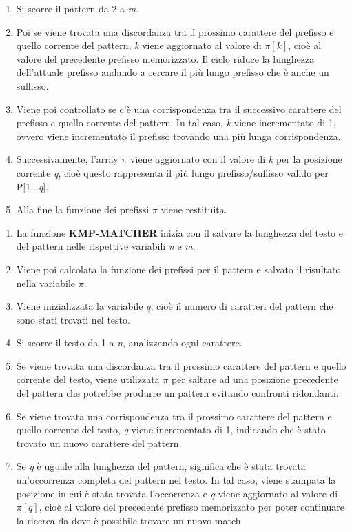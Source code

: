 \documentclass{article}
\begin{document}
\begin{itemize}
\begin{enumerate}[label=\arabic*a.]
              \item Si scorre il pattern da 2 a \textit{m}.
              \item Poi se viene trovata una discordanza tra il prossimo carattere del prefisso e quello corrente del pattern, \textit{k} viene aggiornato al valore di $\pi[k]$, cioè al valore del precedente prefisso memorizzato. Il ciclo riduce la lunghezza dell'attuale prefisso andando a cercare il più lungo prefisso che è anche un suffisso.
              \item Viene poi controllato se c'è una corrispondenza tra il successivo carattere del prefisso e quello corrente del pattern. In tal caso, \textit{k} viene incrementato di 1, ovvero viene incrementato il prefisso trovando una più lunga corrispondenza.
              \item Successivamente, l'array $\pi$ viene aggiornato con il valore di \textit{k} per la posizione corrente \textit{q}, cioè questo rappresenta il più lungo prefisso/suffisso valido per P[1...\textit{q}].
              \item Alla fine la funzione dei prefissi $\pi$ viene restituita.
          \end{enumerate}
          \begin{enumerate}[label=\arabic*b.]
              \item La funzione \textbf{KMP-MATCHER} inizia con il salvare la lunghezza del testo e del pattern nelle rispettive variabili \textit{n} e \textit{m}.
              \item Viene poi calcolata la funzione dei prefissi per il pattern e salvato il risultato nella variabile $\pi$.
              \item Viene inizializzata la variabile \textit{q}, cioè il numero di caratteri del pattern che sono stati trovati nel testo.
              \item Si scorre il testo da 1 a \textit{n}, analizzando ogni carattere.
              \item Se viene trovata una discordanza tra il prossimo carattere del pattern e quello corrente del testo, viene utilizzata $\pi$ per saltare ad una posizione precedente del pattern che potrebbe produrre un pattern evitando confronti ridondanti.
              \item Se viene trovata una corrispondenza tra il prossimo carattere del pattern e quello corrente del testo, \textit{q} viene incrementato di 1, indicando che è stato trovato un nuovo carattere del pattern.
              \item Se \textit{q} è uguale alla lunghezza del pattern, significa che è stata trovata un'occorrenza completa del pattern nel testo. In tal caso, viene stampata la posizione in cui è stata trovata l'occorrenza e \textit{q} viene aggiornato al valore di $\pi[q]$, cioè al valore del precedente prefisso memorizzato per poter continuare la ricerca da dove è possibile trovare un nuovo match.

\end{enumerate}
\end{itemize}
\end{document}

